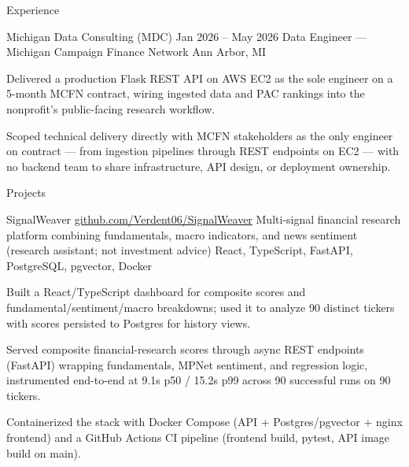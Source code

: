 \documentclass[
	11pt
]{../../../template}
\begin{document}
\begin{rSection}{E}{xperience}
		\begin{rSectionEntry}
			{Michigan Data Consulting (MDC)}
			{Jan 2026 -- May 2026}
			{Data Engineer --- Michigan Campaign Finance Network}
			{}
			{Ann Arbor, MI}

			\item Delivered a production Flask REST API on AWS EC2 as the sole engineer on a 5-month MCFN contract, wiring ingested data and PAC rankings into the nonprofit's public-facing research workflow.
			\item Scoped technical delivery directly with MCFN stakeholders as the only engineer on contract --- from ingestion pipelines through REST endpoints on EC2 --- with no backend team to share infrastructure, API design, or deployment ownership.
		\end{rSectionEntry}
	\end{rSection}

	\begin{rSection}{P}{rojects}
		\begin{rSectionEntry}
			{SignalWeaver}
			{\href{https://github.com/Verdent06/SignalWeaver}{github.com/Verdent06/SignalWeaver}}
			{Multi-signal financial research platform combining fundamentals, macro indicators, and news sentiment (research assistant; not investment advice)}
			{React, TypeScript, FastAPI, PostgreSQL, pgvector, Docker}
			{}

			\item Built a React/TypeScript dashboard for composite scores and fundamental/sentiment/macro breakdowns; used it to analyze 90 distinct tickers with scores persisted to Postgres for history views.
			\item Served composite financial-research scores through async REST endpoints (FastAPI) wrapping fundamentals, MPNet sentiment, and regression logic, instrumented end-to-end at 9.1s p50 / 15.2s p99 across 90 successful runs on 90 tickers.
			\item Containerized the stack with Docker Compose (API + Postgres/pgvector + nginx frontend) and a GitHub Actions CI pipeline (frontend build, pytest, API image build on main).
		\end{rSectionEntry}
	\end{rSection}
\end{document}
